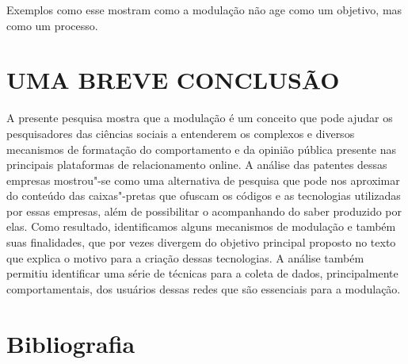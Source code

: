 Exemplos como esse mostram como a modulação não age como um objetivo,
mas como um processo.

\section{UMA BREVE CONCLUSÃO}

A presente pesquisa mostra que a modulação é um conceito que pode ajudar
os pesquisadores das ciências sociais a entenderem os complexos e
diversos mecanismos de formatação do comportamento e da opinião pública
presente nas principais plataformas de relacionamento online. A análise
das patentes dessas empresas mostrou"-se como uma alternativa de pesquisa
que pode nos aproximar do conteúdo das caixas"-pretas que ofuscam os
códigos e as tecnologias utilizadas por essas empresas, além de
possibilitar o acompanhando do saber produzido por elas. Como resultado,
identificamos alguns mecanismos de modulação e também suas finalidades,
que por vezes divergem do objetivo principal proposto no texto que
explica o motivo para a criação dessas tecnologias. A análise também
permitiu identificar uma série de técnicas para a coleta de dados,
principalmente comportamentais, dos usuários dessas redes que são
essenciais para a modulação.

\section{Bibliografia}

